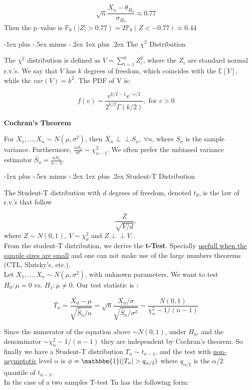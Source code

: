 \documentclass[landscape]{article}
\makeatletter
\renewcommand{\subsubsection}{\@startsection{subsubsection}{3}{0mm}%
                                {-1ex plus -.5ex minus -.2ex}%
                                {1ex plus .2ex}%
                                {\normalfont\small\bfseries}}
\makeatother
\begin{document}
\begin{multicols}{3}
$$\sqrt{n} \frac{\overline{X_n} - \theta_{H_0}}{\sigma_{H_0}} \approx 0.77$$
Then the p--value is $\mathbb{P}_\theta (|Z| > 0.77) = 2 \mathbb{P}_\theta(Z < - 0.77) \approx 0.44$

\subsubsection{The \texorpdfstring{$\chi^2$}{TEXT} Distribution}

The $\chi^2$ distribution is defined as $V = \sum_{i = 1}^{k} Z^{2}_{i}$, where the $Z_i$ are standard normal r.v.'s.
We say that $V$ has $k$ degrees of freedom, which coincides with the $\mathbb{E}[V]$, while the $var(V) = k^2$. The PDF of V is:

$$f(v) = \frac{v^{k/2 - 1} e^{-v/2}}{2^{k/2} \Gamma(k/2)}, \text{ for } v > 0$$

\textbf{Cochran's Theorem}

For $X_1,\dots, X_n \sim  N(\mu, \sigma^2)$, then $\overline{X_n} {\perp \!\!\! \perp} S_n, \: \forall n$, where $S_n$ is the sample variance. 
Furthermore, $\frac{n S_n}{\sigma^2} \sim \chi^{2}_{n-1}$. We often prefer the unbiased variance estimator $\tilde{S_n} = \frac{n S_n}{n-1}$.

\subsubsection{Student-T Distribution}

The Student-T distribution with $d$ degrees of freedom, denoted $t_d$, is the law of r.v.'s that follow 

$$\frac{Z}{\sqrt{V/d}},$$ where $Z \sim N(0, 1), \: V \sim \chi^{2}_{d}$ and $Z {\perp \!\!\! \perp} V$.\\

From the student-T distribution, we derive the \textbf{t-Test}. Specially \underline{usefull when the sample sizes are small} and one can not make use of the 
large numbers theorems (CTL, Slutsky's, etc.).\\

Let $X_1,\dots, X_n \sim  N(\mu, \sigma^2)$, with unknown parameters. We want to test $H_0: \mu = 0 \text{ vs. } H_1: \mu \ne 0$. Our test statistic is :

$$T_n = \frac{\overline{X_n} - \mu}{\sqrt{\tilde{S_n}/n}} = \sqrt{n} \frac{\overline{X_n}/\sigma}{\sqrt{\tilde{S_n}/\sigma^2}} \sim \frac{N(0, 1)}{\chi^{2}_n-1 / (n-1)}$$

Since the numerator of the equation above $\sim N(0, 1)$, under $H_0$, and the denominator $\sim \chi^{2}_n-1 / (n-1)$ they are independent by Cochran's theorem.
So finally we have a Student-T distribution $T_n \sim t_{n-1}$, and the test with \underline{non-asymptotic} level $\alpha$ is 
$\phi = \mathbbm{1}(|T_n| > q_{\alpha/2})$ where $q_{\alpha/2}$ is the $\alpha/2$ quantile of $t_{n-1}$.\\
In the case of a two samples T-test Tn has the following form: 


\end{multicols}
\end{document}

